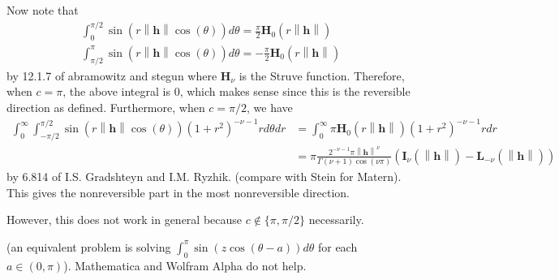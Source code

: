 \documentclass[11pt]{article}
\begin{document}
Now note that \begin{align*}
 \int_0^{\pi/2}  \sin(r\left\lVert \boldsymbol{h}\right\rVert \cos(\theta)) d\theta= \frac{\pi}{2} \boldsymbol{H}_{0}(r\left\lVert \boldsymbol{h}\right\rVert) \\ 
 \int_{\pi/2}^\pi  \sin(r\left\lVert \boldsymbol{h}\right\rVert \cos(\theta)) d\theta= -\frac{\pi}{2} \boldsymbol{H}_{0}(r\left\lVert \boldsymbol{h}\right\rVert)
 \end{align*}
 by 12.1.7 of abramowitz and stegun where $\boldsymbol{H}_\nu$ is the Struve function. Therefore, when $c = \pi$, the above integral is $0$, which makes sense since this is the reversible direction as defined. 
% 
Furthermore, when $c = \pi/2$, we have \begin{align*}
 \int_0^\infty  \int_{-\pi/2}^{\pi/2} \sin(r\left\lVert \boldsymbol{h}\right\rVert \cos(\theta)) (1 +r^2)^{- \nu - 1} r d\theta dr&= \int_0^\infty \pi\boldsymbol{H}_0(r\left\lVert \boldsymbol{h}\right\rVert)(1 + r^2)^{-\nu - 1} r dr \\
& =\pi\frac{2^{-\nu -1} \pi \left\lVert \boldsymbol{h}\right\rVert^{\nu}}{\Gamma(\nu+1) \cos(\nu \pi)} \left( \boldsymbol{I}_{\nu }(\left\lVert \boldsymbol{h}\right\rVert) - \boldsymbol{L}_{-\nu} (\left\lVert \boldsymbol{h}\right\rVert)\right)
\end{align*}
by 6.814 of I.S. Gradshteyn and I.M. Ryzhik. (compare with Stein for Matern). This gives the nonreversible part in the most nonreversible direction.

However, this does not work in general because $c\notin \{\pi, \pi/2\}$ necessarily. 

 (an equivalent problem is solving $\int_0^\pi \sin(z\cos(\theta -a)) d\theta$ for each $a \in (0, \pi)$). Mathematica and Wolfram Alpha do not help.




 
 
\end{document}
